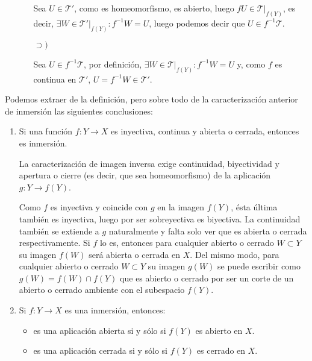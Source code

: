 \begin{demo}
\begin{itemize}
\begin{itemize}
        Sea $U \in \mathcal{T}'$, como es homeomorfismo, es abierto, luego $fU\in \mathcal{T}|_{f\left( Y \right)}$, es decir, $\exists W \in \mathcal{T}'|_{f\left( Y \right)}: f^{-1}W = U$, luego podemos decir que $U \in f^{-1}\mathcal{T}$. 
        \item[$\supset)$]
        
        Sea $U \in f^{-1}\mathcal{T}$, por definición, $\exists W \in \mathcal{T}|_{f\left( Y \right)}: f^{-1}W = U$ y, como $f$ es continua en $\mathcal{T}'$, $U = f^{-1} W \in \mathcal{T}'$.
    \end{itemize}
\end{itemize} 
\end{demo}

\begin{obs}
Podemos extraer de la definición, pero sobre todo de la caracterización anterior de inmersión las siguientes conclusiones:
\begin{enumerate}
    \item Si una función $f: Y \rightarrow X$ es inyectiva, continua y abierta o cerrada, entonces es inmersión.
    \begin{demo}
    La caracterización de imagen inversa exige continuidad, biyectividad y apertura o cierre (es decir, que sea homeomorfismo) de la aplicación $g: Y \rightarrow f(Y)$. 

    Como $f$ es inyectiva y coincide con $g$ en la imagen $f(Y)$, ésta última también es inyectiva, luego por ser sobreyectiva es biyectiva. La continuidad también se extiende a $g$ naturalmente y falta solo ver que es abierta o cerrada respectivamente. Si $f$ lo es, entonces para cualquier abierto o cerrado $W\subset Y$ su imagen $f(W)$ será abierta o cerrada en $X$. Del mismo modo, para cualquier abierto o cerrado $W\subset Y$ su imagen $g(W)$ se puede escribir como $g(W) = f(W)\cap f(Y)$ que es abierto o cerrado por ser un corte de un abierto o cerrado ambiente con el subespacio $f(Y)$.
    \end{demo}

    \item Si $f: Y \rightarrow X$ es una inmersión, entonces:
	\begin{itemize}
		\item es una aplicación abierta si y sólo si 	$f(Y)$ es abierto en $X$.
		\item es una aplicación cerrada si y sólo si $f(Y)$ es cerrado en $X$.
	\end{itemize}	    
    

\end{enumerate}
\end{obs}
